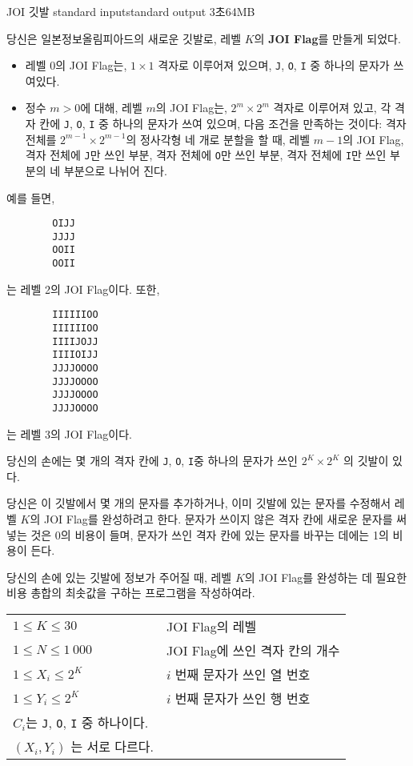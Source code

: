 \begin{problem}{JOI 깃발}
	{standard input}{standard output}
	{3초}{64MB}{}
	
	당신은 일본정보올림피아드의 새로운 깃발로, 레벨 $K$의 \textbf{JOI Flag}를 만들게 되었다.
		
	\begin{itemize}
		\item 레벨 0의 JOI Flag는, $1 \times 1$ 격자로 이루어져 있으며, \texttt{J}, \texttt{O}, \texttt{I} 중 하나의 문자가 쓰여있다.
		\item 정수 $m > 0$에 대해, 레벨 $m$의 JOI Flag는, $2^m \times 2^m$ 격자로 이루어져 있고, 각 격자 칸에 \texttt{J}, \texttt{O}, \texttt{I} 중 하나의 문자가 쓰여 있으며, 다음 조건을 만족하는 것이다: 격자 전체를 $2^{m-1} \times 2^{m-1}$의 정사각형 네 개로 분할을 할 때, 레벨 $m-1$의 JOI Flag, 격자 전체에 \texttt{J}만 쓰인 부분, 격자 전체에 \texttt{O}만 쓰인 부분, 격자 전체에 \texttt{I}만 쓰인 부분의 네 부분으로 나뉘어 진다.
	\end{itemize}

	예를 들면, 
	
	\begin{verbatim}
	    OIJJ
	    JJJJ
	    OOII
	    OOII
	\end{verbatim}
	
	는 레벨 2의 JOI Flag이다. 또한,
	
	
	\begin{verbatim}
	    IIIIIIOO
	    IIIIIIOO
	    IIIIJOJJ
	    IIIIOIJJ
	    JJJJOOOO
	    JJJJOOOO
	    JJJJOOOO
	    JJJJOOOO
	\end{verbatim}
	
	는 레벨 3의 JOI Flag이다.
	
	당신의 손에는 몇 개의 격자 칸에 \texttt{J}, \texttt{O}, \texttt{I}중 하나의 문자가 쓰인 $2^K \times 2^K$ 의 깃발이 있다.
	
	당신은 이 깃발에서 몇 개의 문자를 추가하거나, 이미 깃발에 있는 문자를 수정해서 레벨 $K$의 JOI Flag를 완성하려고 한다. 문자가 쓰이지 않은 격자 칸에 새로운 문자를 써넣는 것은 0의 비용이 들며, 문자가 쓰인 격자 칸에 있는 문자를 바꾸는 데에는 1의 비용이 든다.
	
	당신의 손에 있는 깃발에 정보가 주어질 때, 레벨 $K$의 JOI Flag를 완성하는 데 필요한 비용 총합의 최솟값을 구하는 프로그램을 작성하여라.
	
	\Constraints
	
	
	\begin{tabular}{ll}
		$1 \le K \le 30$ & JOI Flag의 레벨 \\
		$1 \le N \le 1\ 000$ & JOI Flag에 쓰인 격자 칸의 개수 \\
		$1 \le X_i \le 2^K$ & $i$ 번째 문자가 쓰인 열 번호 \\
		$1 \le Y_i \le 2^K$ & $i$ 번째 문자가 쓰인 행 번호 \\
		$C_i$는 \texttt{J}, \texttt{O}, \texttt{I} 중 하나이다. & \\
		$(X_i, Y_i)$ 는 서로 다르다. &
	\end{tabular}
	

\end{problem}
